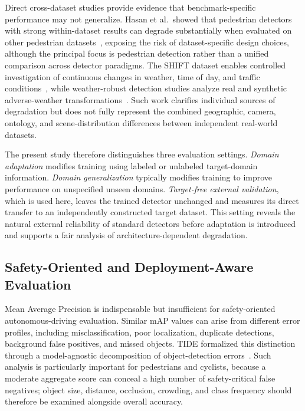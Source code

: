 Direct cross-dataset studies provide evidence that benchmark-specific performance may not
generalize. Hasan et al.\ showed that pedestrian detectors with strong within-dataset
results can degrade substantially when evaluated on other pedestrian
datasets~\cite{hasan2021generalizablepedestrian}, exposing the risk of dataset-specific
design choices, although the principal focus is pedestrian detection rather than a unified
comparison across detector paradigms. The SHIFT dataset enables controlled investigation
of continuous changes in weather, time of day, and traffic conditions~\cite{sun2022shift},
while weather-robust detection studies analyze real and synthetic adverse-weather
transformations~\cite{gupta2024weather}. Such work clarifies individual sources of
degradation but does not fully represent the combined geographic, camera, ontology, and
scene-distribution differences between independent real-world datasets.

The present study therefore distinguishes three evaluation settings. \emph{Domain
adaptation} modifies training using labeled or unlabeled target-domain information.
\emph{Domain generalization} typically modifies training to improve performance on
unspecified unseen domains. \emph{Target-free external validation}, which is used here,
leaves the trained detector unchanged and measures its direct transfer to an independently
constructed target dataset. This setting reveals the natural external reliability of
standard detectors before adaptation is introduced and supports a fair analysis of
architecture-dependent degradation.

\subsection{Safety-Oriented and Deployment-Aware Evaluation}
\label{sec:related_safety}

Mean Average Precision is indispensable but insufficient for safety-oriented
autonomous-driving evaluation. Similar mAP values can arise from different error profiles,
including misclassification, poor localization, duplicate detections, background false
positives, and missed objects. TIDE formalized this distinction through a model-agnostic
decomposition of object-detection errors~\cite{bolya2020tide}. Such analysis is
particularly important for pedestrians and cyclists, because a moderate aggregate score
can conceal a high number of safety-critical false negatives; object size, distance,
occlusion, crowding, and class frequency should therefore be examined alongside overall
accuracy.

